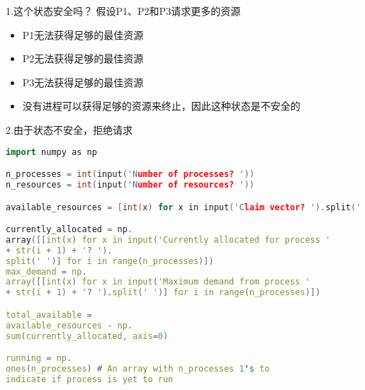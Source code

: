 1.这个状态安全吗？ 假设P1、P2和P3请求更多的资源
\begin{itemize}
\item P1无法获得足够的最佳资源
\item P2无法获得足够的最佳资源
\item P3无法获得足够的最佳资源
\item 没有进程可以获得足够的资源来终止，因此这种状态是不安全的
\end{itemize}

2.由于状态不安全，拒绝请求
\begin{lstlisting}[language=cpp]
import numpy as np

n_processes = int(input('Number of processes? '))
n_resources = int(input('Number of resources? '))

available_resources = [int(x) for x in input('Claim vector? ').split(' ')]

currently_allocated = np.
array([[int(x) for x in input('Currently allocated for process ' 
+ str(i + 1) + '? ').
split(' ')] for i in range(n_processes)])
max_demand = np.
array([[int(x) for x in input('Maximum demand from process ' 
+ str(i + 1) + '? ').split(' ')] for i in range(n_processes)])

total_available = 
available_resources - np.
sum(currently_allocated, axis=0)

running = np.
ones(n_processes) # An array with n_processes 1's to 
indicate if process is yet to run
\end{lstlisting}